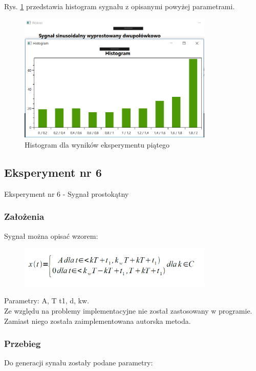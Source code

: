 \documentclass[12pt]{article}
\begin{document}
\newpage
Rys. \ref{Histogram dla wyników eksperymentu piątego} przedstawia histogram sygnału z opisanymi powyżej parametrami. 
\begin{figure}[h!]
 \centering
 \includegraphics[width=9.3cm]{SinDwuPHist.PNG}
 \vspace{-0.3cm}
 \caption{Histogram dla wyników eksperymentu piątego}
 \label{Histogram dla wyników eksperymentu piątego}
\end{figure}

\subsection{Eksperyment nr 6}

Eksperyment nr 6 - Sygnał prostokątny

\subsubsection{Założenia}
Sygnał można opisać wzorem:
\begin{figure}[h!]
 \centering
 \includegraphics[width=9.3cm]{KwadWzor.PNG}
 \vspace{-0.3cm}
 \label{gw}
\end{figure}
\newpage
Parametry: A, T t1, d, kw.\\
Ze względu na problemy implementacyjne nie został zastosowany w programie. Zamiast niego została zaimplementowana autorska metoda.
\subsubsection{Przebieg}
Do generacji synału zostały podane parametry:
\end{document}
